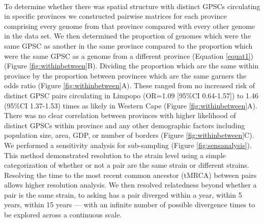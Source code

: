 \documentclass{article}
\begin{document}
\\To determine whether there was spatial structure with distinct GPSCs circulating in specific provinces we constructed pairwise matrices for each province comprising every genome from that province compared with every other genome in the data set. We then determined the proportion of genomes which were the same GPSC as another in the same province compared to the proportion which were the same GPSC as a genome from a different province (Equation \ref{equat1})(Figure \ref{fig:withinbetween}B). Dividing the proportion which are the same within province by the proportion between provinces which are the same garners the odds ratio (Figure \ref{fig:withinbetween}A). These ranged from no increased risk of distinct GPSC pairs circulating in Limpopo (OR=1.09 [95\%CI 0.64-1.57]) to 1.46 (95\%CI 1.37-1.53) times as likely in Western Cape (Figure \ref{fig:withinbetween}A). There was no clear correlation between provinces with higher likelihood of distinct GPSCs within province and any other demographic factors including population size, area, GDP, or number of borders (Figure \ref{fig:withinbetween}C). We performed a sensitivity analysis for sub-sampling (Figure \ref{fig:sensanalysis}). \\This method demonstrated resolution to the strain level using a simple categorization of whether or not a pair are the same strain or different strains. Resolving the time to the most recent common ancestor (tMRCA) between pairs allows higher resolution analysis. We then resolved relatedness beyond whether a pair is the same strain, to asking has a pair diverged within a year, within 5 years, within 15 years --- with an infinite number of possible divergence times to be explored across a continuous scale. 
\end{document}
